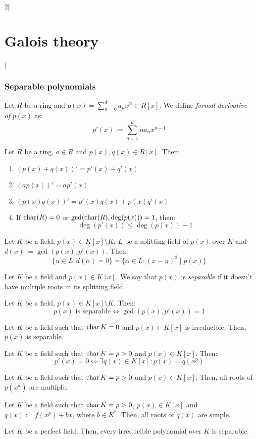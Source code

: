 \documentclass[../../../main.tex]{subfiles}
\begin{document}
\begin{multicols}{2}[\section{Galois theory}]
  \subsubsection{Separable polynomials}
  \begin{definition}
    Let $R$ be a ring and $p(x)=\sum_{n=0}^da_nx^n\in R[x]$. We define \textit{formal derivative of $p(x)$} as: $$p'(x):=\sum_{n=1}^dna_nx^{n-1}$$
  \end{definition}
  \begin{prop}
    Let $R$ be a ring, $a\in R$ and $p(x),q(x)\in R[x]$. Then:
    \begin{enumerate}
      \item ${(p(x)+q(x))}'=p'(x)+q'(x)$
      \item $(ap(x))'=ap'(x)$
      \item $(p(x)q(x))'=p'(x)q(x)+p(x)q'(x)$
      \item If $\operatorname{char}(R)=0$ or $\gcd(\operatorname{char}(R),\deg(p(x)))=1$, then: $$\deg(p'(x))\leq\deg(p(x))-1$$
    \end{enumerate}
  \end{prop}
  \begin{prop}
    Let $K$ be a field, $p(x)\in K[x]\setminus K$, $L$ be a splitting field of $p(x)$ over $K$ and $d(x):=\gcd(p(x),p'(x))$. Then:
    $$\{\alpha\in L:d(\alpha)=0\}=\{\alpha\in L:{(x-\alpha)}^2\mid p(x)\}$$
  \end{prop}
  \begin{definition}
    Let $K$ be a field and $p(x)\in K[x]$. We say that $p(x)$ is \textit{separable} if it doesn't have multiple roots in its splitting field.
  \end{definition}
  \begin{corollary}
    Let $K$ be a field, $p(x)\in K[x]\setminus K$. Then: $$p(x)\text{ is separable}\iff\gcd(p(x),p'(x))=1$$
  \end{corollary}
  \begin{corollary}
    Let $K$ be a field such that $\operatorname{char} K=0$ and $p(x)\in K[x]$ is irreducible. Then, $p(x)$ is separable.
  \end{corollary}
  \begin{lemma}
    Let $K$ be a field such that $\operatorname{char} K=p>0$ and $p(x)\in K[x]$. Then: $$p'(x)=0\iff\exists q(x)\in K[x]:p(x)=q(x^p)$$
  \end{lemma}
  \begin{corollary}
    Let $K$ be a field such that $\operatorname{char} K=p>0$ and $p(x)\in K[x]$. Then, all roots of $p(x^d)$ are multiple.
  \end{corollary}
  \begin{corollary}
    Let $K$ be a field such that $\operatorname{char} K=p>0$, $p(x)\in K[x]$ and $q(x):=f(x^p)+bx$, where $b\in K^*$. Then, all roots of $q(x)$ are simple.
  \end{corollary}
  \begin{theorem}
    Let $K$ be a perfect field. Then, every irreducible polynomial over $K$ is separable.
  \end{theorem}

\end{multicols}
\end{document}
